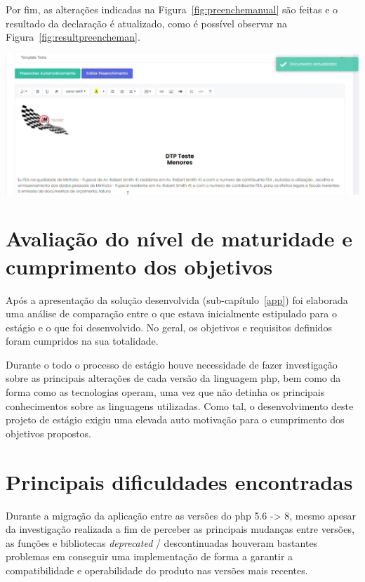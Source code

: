 Por fim, as alterações indicadas na Figura~\ref{fig:preenchemanual} são feitas e o resultado da declaração é atualizado, como é possível observar na Figura~\ref{fig:resultpreencheman}.

\begin{center}
        \includegraphics[width=\textwidth,height=\textheight,keepaspectratio]{images/resultpreencheman.png}
        \label{fig:resultpreencheman}
\end{center}

\section{Avaliação do nível de maturidade e cumprimento dos objetivos}

Após a apresentação da solução desenvolvida (sub-capítulo~\ref{app}) foi elaborada uma análise de comparação entre o que estava inicialmente estipulado para o estágio e o que foi desenvolvido. No geral, os objetivos e requisitos definidos foram cumpridos na sua totalidade.

Durante o todo o processo de estágio houve necessidade de fazer investigação sobre as principais alterações de cada versão da linguagem \acrshort{php}, bem como da forma como as tecnologias operam, uma vez que não detinha os principais conhecimentos sobre as linguagens utilizadas. Como tal, o desenvolvimento deste projeto de estágio exigiu uma elevada auto motivação para o cumprimento dos objetivos propostos.


\section{Principais dificuldades encontradas}

Durante a migração da aplicação entre as versões do \acrshort{php} 5.6 -> 8, mesmo apesar da investigação realizada a fim de perceber as principais mudanças entre versões, as funções e bibliotecas \textit{deprecated} / descontinuadas houveram bastantes problemas em conseguir uma implementação de forma a garantir a compatibilidade e operabilidade do produto nas versões mais recentes.

